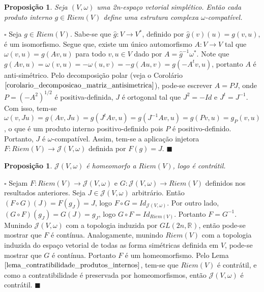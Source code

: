 \documentclass[12pt]{book}
\newtheorem{proposicao}[teorema]{Proposição}
\newenvironment{prova}[1]{$\square$ #1}{\hfill$\blacksquare$}
\newcommand{\estruturascomplexas}[2]{\mathcal{J}(#1, #2)}
\newcommand{\estruturascomplexaspadrao}{\mathcal{J}(V, \omega)}
\newcommand{\formaSimpletica}[2]{\omega(#1, #2)}
\newcommand{\generalgroup}[2]{GL(#1, #2)}
\newcommand{\generalgroupreal}[1]{\generalgroup{#1}{\real{}}}
\newcommand{\produtosinternos}[1]{Riem(#1)}
\newcommand{\real}[1]{\mathbb{R}^{#1}}
\begin{document}
	\begin{proposicao}
		Seja $(V, \omega)$ uma 2n-espaço vetorial simplético. Então cada produto interno $g \in \produtosinternos{V}$ define uma estrutura complexa $\omega$-compatível.
	\end{proposicao}
	\begin{prova}
		Seja $g \in \produtosinternos{V}$. Sabe-se que $\hat{g}:V \to V^{*}$, definido por $\hat{g}(v)(u)=g(v,u)$, é um isomorfismo. Segue que, existe um único automorfismo $A:V\to V$ tal que $\formaSimpletica{v}{u} = g(Av,u)$ para todo $v,u \in V$ dado por $A = \hat{g}^{-1}\omega
		^{*}$. Note que $g(Av,u) = \formaSimpletica{v}{u} = -\formaSimpletica{u}{v} = -g(Au,v) = g(-A^{t}v,u)$, portanto $A$ é anti-simétrico. Pelo decomposição polar (veja o Corolário $\ref{corolario_decomposicao_matriz_antisimetrica}$), pode-se escrever $A=PJ$, onde $P = (-A^{2})^{1/2}$ é positiva-definida, $J$ é ortogonal tal que $J^{2} = -Id$ e $J^{t} = J^{-1}$. Com isso, tem-se $\formaSimpletica{v}{Ju} = g(Av, Ju) = g(J^{t}Av, u)  = g(J^{-1}Av, u) = g(Pv, u) = g_{P}(v,u)$, o que é um produto interno positivo-definido pois $P$ é positivo-definido. Portanto, $J$ é $\omega$-compatível. Assim, tem-se a aplicação injetora $F: \produtosinternos{V} \to \estruturascomplexas{V}{\omega}$ definida por $F(g) = J$.
	\end{prova}
	
	\begin{proposicao}\label{proposicao_J_contratil}
		$\estruturascomplexaspadrao$ é homeomorfo a $\produtosinternos{V}$, logo é contrátil.
	\end{proposicao}
	\begin{prova}
		Sejam $F: \produtosinternos{V} \to \estruturascomplexaspadrao$ e $G:\estruturascomplexaspadrao \to \produtosinternos{V}$ definidos nos resultados anteriores. Seja $J \in \estruturascomplexaspadrao$ arbitrário. Então $(F\circ G)(J) = F(g_{J}) =J$, logo $F\circ G = Id_{\estruturascomplexaspadrao}$. Por outro lado, $(G\circ F)(g_{J}) = G(J) = g_{J}$, logo $G\circ F = Id_{\produtosinternos{V}}$. Portanto $F = G^{-1}$. Munindo $\estruturascomplexaspadrao$ com a topologia induzida por $\generalgroupreal{2n}$, então pode-se mostrar que $F$ é contínua. Analogamente, munindo $\produtosinternos{V}$ com a topologia induzida do espaço vetorial de todas as forma simétricas definida em $V$, pode-se mostrar que $G$ é contínua. Portanto $F$ é um homeomorfismo. Pelo Lema $\ref{lema_contratibilidade_produtos_internos}$, tem-se que $\produtosinternos{V}$ é contrátil, e como a contratibilidade é preservada por homeomorfismos, então $\estruturascomplexaspadrao$ é contrátil.
	\end{prova}
	
\end{document}
